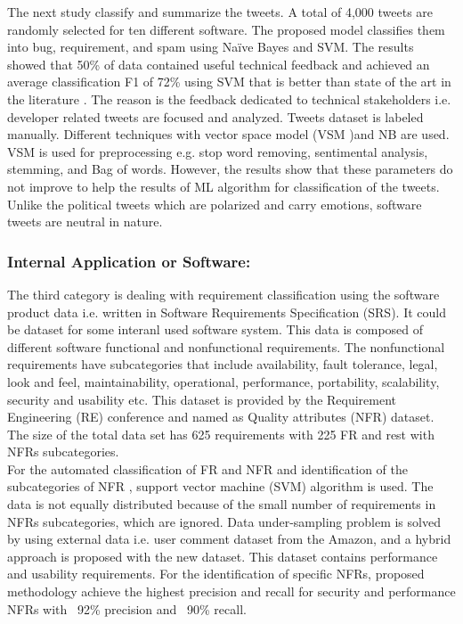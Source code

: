 	The next study \cite{williams2017} classify and summarize the tweets. A total of 
4,000 tweets are randomly selected for ten different software. The proposed model
classifies them into bug, requirement, and spam using Naïve Bayes and SVM. The results
showed that 50\% of data contained useful technical feedback and achieved an average
classification F1 of 72\% using SVM that is better than state of the art in the literature  \cite{guzman2017}. The
reason is the feedback dedicated to technical stakeholders i.e. developer related tweets are
focused and analyzed. Tweets dataset is labeled manually. Different techniques with vector space model (VSM )and
NB are used. VSM is used for preprocessing e.g. stop word removing, sentimental analysis, stemming,
and Bag of words. However, the results show that these parameters do not
improve to help the results of ML algorithm for classification of the tweets. Unlike the political
tweets which are polarized and carry emotions, software tweets are neutral in nature.\\

\subsubsection{Internal Application or Software: }
The third category is dealing with requirement classification using the software product data
i.e. written in Software Requirements Specification (SRS). It could be dataset for some interanl used software system. This data is composed of different software functional and nonfunctional
requirements.  The nonfunctional requirements have subcategories that include availability,
fault tolerance, legal, look and feel, maintainability, operational, performance, portability,
scalability, security and usability etc. This dataset is provided by the Requirement Engineering
(RE) conference and named as Quality attributes (NFR) dataset. The size of the total data set
has 625 requirements with 225 FR and rest with NFRs subcategories. \\

	For the automated classification of FR and NFR and identification of the subcategories of NFR \cite{kurtanovic2017}, support
vector machine (SVM) algorithm is used. The data is not equally distributed because of the small
number of requirements in NFRs subcategories, which are ignored. Data
under-sampling problem is solved by using external data i.e. user comment
dataset from the Amazon, and a hybrid approach is proposed with the new dataset. This
dataset contains performance and usability requirements. For the identification of specific
NFRs, proposed methodology achieve the highest precision and recall for security and
performance NFRs with ~92\% precision and ~90\% recall. \\

